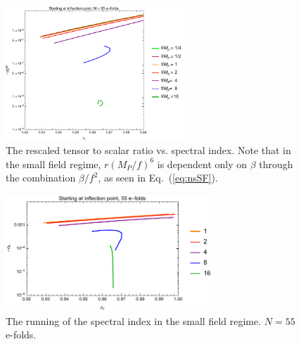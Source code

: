 \documentclass[aps,amsfonts,amsmath,prd,preprint,nofootinbib,superscriptaddress]{revtex4}
\newcommand{\Mp}{{M_{P}}}
\begin{document}
\begin{figure}[!h]
  \centering
    \includegraphics[width=0.6\textwidth]{figures/nsrf6plotvsf.pdf}
    \caption{The rescaled tensor to scalar ratio vs. spectral index. Note that in the small field regime, $r (\Mp/f)^6$ is dependent only on $\beta$ through the combination $\beta/f^2$, as seen in Eq.~(\ref{eq:nsSF}).}
\end{figure}




\begin{figure}[!h]
  \centering
    \includegraphics[width=0.7\textwidth]{figures/alphasvsnsplot.pdf}
    \caption{The running of the spectral index in the small field regime.  $N = 55$ e-folds.}
\end{figure}
\end{document}
